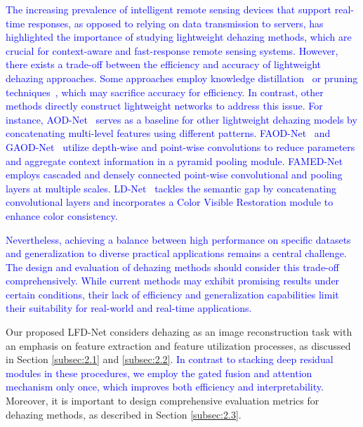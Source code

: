 \documentclass[lettersize,journal]{IEEEtran}
\begin{document}
\textcolor{blue}{The increasing prevalence of intelligent remote sensing devices that support real-time responses, as opposed to relying on data transmission to servers, has highlighted the importance of studying lightweight dehazing methods, which are crucial for context-aware and fast-response remote sensing systems. However, there exists a trade-off between the efficiency and accuracy of lightweight dehazing approaches. Some approaches employ knowledge distillation~\cite{hong2020distilling, suresh2022rich} or pruning techniques~\cite{liu2022aerial}, which may sacrifice accuracy for efficiency. In contrast, other methods directly construct lightweight networks to address this issue. For instance, AOD-Net~\cite{li2017aod} serves as a baseline for other lightweight dehazing models by concatenating multi-level features using different patterns. FAOD-Net~\cite{2020FAOD} and GAOD-Net~\cite{GAOD} utilize depth-wise and point-wise convolutions to reduce parameters and aggregate context information in a pyramid pooling module. FAMED-Net~\cite{2020FAMED} employs cascaded and densely connected point-wise convolutional and pooling layers at multiple scales. LD-Net~\cite{ullah2021light} tackles the semantic gap by concatenating convolutional layers and incorporates a Color Visible Restoration module to enhance color consistency.}

\textcolor{blue}{Nevertheless, achieving a balance between high performance on specific datasets and generalization to diverse practical applications remains a central challenge. The design and evaluation of dehazing methods should consider this trade-off comprehensively. While current methods may exhibit promising results under certain conditions, their lack of efficiency and generalization capabilities limit their suitability for real-world and real-time applications.} 

Our proposed LFD-Net considers dehazing as an image reconstruction task with an emphasis on feature extraction and feature utilization processes, as discussed in Section \ref{subsec:2.1} and \ref{subsec:2.2}. \textcolor{blue}{In contrast to stacking deep residual modules in these procedures, we employ the gated fusion and attention mechanism only once, which improves both efficiency and interpretability.} Moreover, it is important to design comprehensive evaluation metrics for dehazing methods, as described in Section \ref{subsec:2.3}. 
\end{document}
